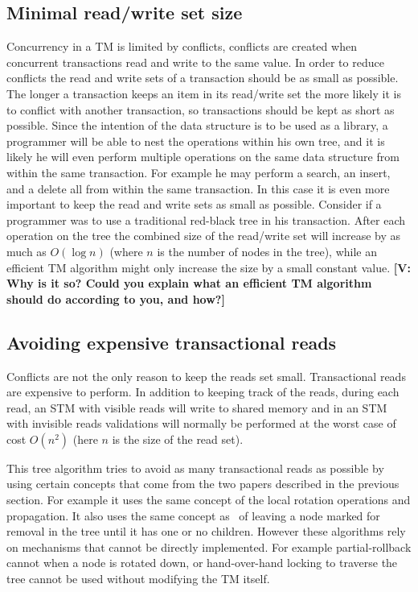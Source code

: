 \documentclass[10pt]{sigplanconf}
\newcommand{\vincent}[1]{{\bf [V: #1]}}
\begin{document}
\subsection{Minimal read/write set size}
Concurrency in a TM is limited by conflicts, conflicts are created when concurrent transactions read and write to the same value.
In order to reduce conflicts the read and write sets of a transaction should be as small as possible.
The longer a transaction keeps an item in its read/write set the more likely it is to conflict with another transaction, so transactions should be kept as short as possible.
Since the intention of the data structure is to be used as a library, a programmer will be able to nest the operations within his own tree, and it is likely he will even perform multiple operations on the same data structure from within the same transaction.
For example he may perform a search, an insert, and a delete all from within the same transaction.
In this case it is even more important to keep the read and write sets as small as possible.
Consider if a programmer was to use a traditional red-black tree in his transaction.
After each operation on the tree the combined size of the read/write set will increase by as much as $O(\log{n})$ (where $n$ is the number of nodes in the tree),
while an efficient TM algorithm might only increase the size by a small constant value.
\vincent{Why is it so? Could you explain what an efficient TM algorithm should do according to you, and how?}

\subsection{Avoiding expensive transactional reads}
Conflicts are not the only reason to keep the reads set small.
Transactional reads are expensive to perform.
In addition to keeping track of the reads, during each read, an STM with visible reads will write to shared memory
 and in an STM with invisible reads validations will normally be performed at the worst case of cost $O(n^2)$ 
(here $n$ is the size of the read set).

This tree algorithm tries to avoid as many transactional reads as possible by using certain concepts
that come from the two papers described in the previous section.
For example it uses the same concept of the local rotation operations and propagation.
It also uses the same concept as~\cite{BCCO10} of leaving a node marked for removal in the tree until it has one or no children.
However these algorithms rely on mechanisms that cannot be directly implemented.
For example partial-rollback cannot when a node is rotated down, or hand-over-hand locking to traverse the tree cannot be used without modifying the TM itself.
\end{document}
